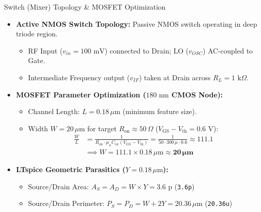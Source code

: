 \documentclass{beamer}
\begin{document}
\begin{frame}{Switch (Mixer) Topology \& MOSFET Optimization}
  \begin{itemize}
    \item \textbf{Active NMOS Switch Topology:} Passive NMOS switch operating in deep triode region.
    \begin{itemize}
      \item RF Input ($v_{in} = 100\text{ mV}$) connected to Drain; LO ($v_{OSC}$) AC-coupled to Gate.
      \item Intermediate Frequency output ($v_{IF}$) taken at Drain across $R_L = 1\text{ k}\Omega$.
    \end{itemize}
    \item \textbf{MOSFET Parameter Optimization ($180\text{ nm}$ CMOS Node):}
    \begin{itemize}
      \item Channel Length: $L = 0.18\,\mu\text{m}$ (minimum feature size).
      \item Width $W = 20\,\mu\text{m}$ for target $R_{\text{on}} \approx 50\,\Omega$ ($V_{\text{GS}} - V_{\text{th}} = 0.6\text{ V}$):
      \begin{align*}
        \frac{W}{L} &= \frac{1}{R_{\text{on}}\cdot \mu_n C_{\text{ox}}(V_{\text{GS}}-V_{\text{th}})} = \frac{1}{50 \cdot 300\,\mu \cdot 0.6} \approx 111.1 \\
        &\implies W = 111.1 \times 0.18\,\mu\text{m} \approx \mathbf{20\,\mu\text{m}}
      \end{align*}
    \end{itemize}
    \item \textbf{LTspice Geometric Parasitics ($Y = 0.18\,\mu\text{m}$):}
    \begin{itemize}
      \item Source/Drain Area: $A_S = A_D = W \times Y = 3.6\text{ p}$ (\texttt{3.6p})
      \item Source/Drain Perimeter: $P_S = P_D = W + 2Y = 20.36\,\mu\text{m}$ (\texttt{20.36u})
    \end{itemize}
  \end{itemize}
\end{frame}
\end{document}
